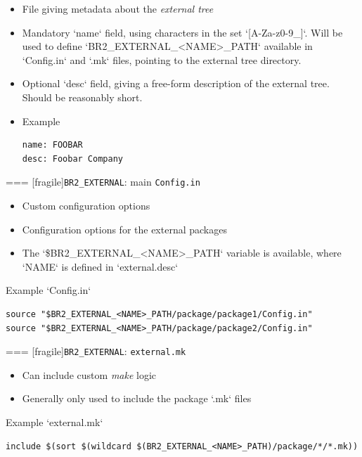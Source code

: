   \begin{itemize}
  \item File giving metadata about the {\em external tree}
  \item Mandatory
    `name` field, using characters in the set
    `[A-Za-z0-9_]`. Will be used to define
    `BR2_EXTERNAL_<NAME>_PATH` available in
    `Config.in` and `.mk` files, pointing
    to the external tree directory.
  \item Optional
    `desc` field, giving a free-form description of the external tree. Should be reasonably short.
  \item Example
    \begin{block}{}
\begin{verbatim}
name: FOOBAR
desc: Foobar Company
\end{verbatim}
    \end{block}
  \end{itemize}



=== [fragile]{{\tt BR2\_EXTERNAL}: main {\tt Config.in}}

  \begin{itemize}
  \item Custom configuration options
  \item Configuration options for the external packages
  \item The
    `\$BR2_EXTERNAL_<NAME>_PATH` variable is available, where
    `NAME` is defined in `external.desc`
  \end{itemize}

  \begin{block}{Example `Config.in`}
\begin{verbatim}
source "$BR2_EXTERNAL_<NAME>_PATH/package/package1/Config.in"
source "$BR2_EXTERNAL_<NAME>_PATH/package/package2/Config.in"
\end{verbatim}
  \end{block}



=== [fragile]{{\tt BR2\_EXTERNAL}: {\tt external.mk}}

  \begin{itemize}
  \item Can include custom {\em make} logic
  \item Generally only used to include the package `.mk` files
  \end{itemize}

  \begin{block}{Example `external.mk`}
\begin{verbatim}
include $(sort $(wildcard $(BR2_EXTERNAL_<NAME>_PATH)/package/*/*.mk))
\end{verbatim}
  \end{block}


